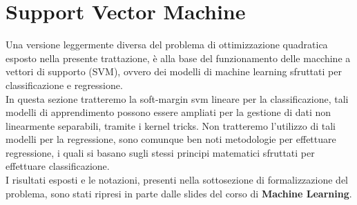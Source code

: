 \documentclass[12pt]{extarticle}
\begin{document}
\section{Support Vector Machine}
Una versione leggermente diversa del problema di ottimizzazione quadratica esposto nella presente trattazione, è alla base del funzionamento delle macchine a vettori di supporto (SVM), ovvero dei modelli di machine learning sfruttati per classificazione e regressione.\\
In questa sezione tratteremo la soft-margin svm lineare per la classificazione, tali modelli di apprendimento possono essere ampliati per la gestione di dati non linearmente separabili, tramite i kernel tricks.
Non tratteremo l'utilizzo di tali modelli per la regressione, sono comunque ben noti metodologie per effettuare regressione, i quali si basano sugli stessi principi matematici sfruttati per effettuare classificazione.\\
I risultati esposti e le notazioni, presenti nella sottosezione di formalizzazione del problema, sono stati ripresi in parte dalle slides del corso di \textbf{Machine Learning}.
\end{document}
